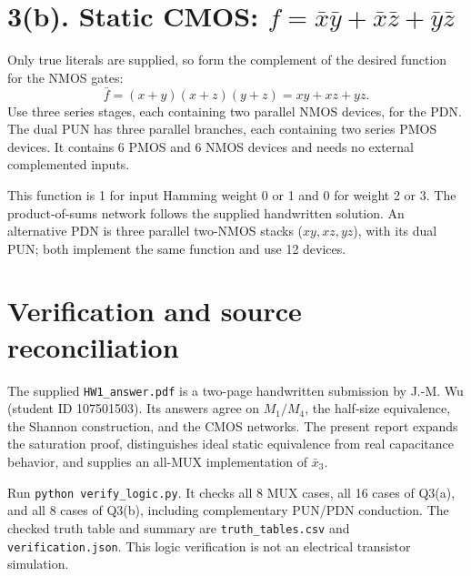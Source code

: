 \documentclass[11pt]{article}
\newcommand{\mos}[4]{\begin{scope}[shift={(#1,#2)}]
\draw (0,.24)--(0,-.24);
\draw (0,.20)--(.25,.20)--(.25,.5);
\draw (0,-.20)--(.25,-.20)--(.25,-.5);
\draw (-.16,.23)--(-.16,-.23);
\ifnum#4=1\draw (-.26,0) circle (.06);\draw (-.75,0)--(-.32,0);\else\draw (-.75,0)--(-.16,0);\fi
\node[anchor=east,font=\small] at (-.76,0) {$#3$};
\end{scope}}
\newcommand{\ground}[2]{\draw (#1,#2)--(#1,{#2-.12});\draw ({#1-.17},{#2-.12})--({#1+.17},{#2-.12});\draw ({#1-.11},{#2-.20})--({#1+.11},{#2-.20});}
\newcommand{\rail}[3]{\draw (#1,#2)--(#1,{#2+.15});\node[above,font=\small] at (#1,{#2+.15}) {$#3$};}
\newcommand{\outputnode}[3]{\fill (#1,#2) circle (.04);\draw (#1,#2)--({#1+.7},#2) node[right] {$#3$};}
\begin{document}
\newpage
\section*{3(b). Static CMOS: $f=\bar{x}\bar{y}+\bar{x}\bar{z}+\bar{y}\bar{z}$}
Only true literals are supplied, so form the complement of the desired function for the NMOS gates:
\[
 \bar f=(x+y)(x+z)(y+z)=xy+xz+yz.
\]
Use three series stages, each containing two parallel NMOS devices, for the PDN. The dual PUN has three parallel branches, each containing two series PMOS devices. It contains 6 PMOS and 6 NMOS devices and needs no external complemented inputs.
\begin{center}\end{center}
This function is 1 for input Hamming weight 0 or 1 and 0 for weight 2 or 3. The product-of-sums network follows the supplied handwritten solution. An alternative PDN is three parallel two-NMOS stacks ($xy,xz,yz$), with its dual PUN; both implement the same function and use 12 devices.

\section*{Verification and source reconciliation}
The supplied \texttt{HW1\_answer.pdf} is a two-page handwritten submission by J.-M. Wu (student ID 107501503). Its answers agree on $M_1/M_4$, the half-size equivalence, the Shannon construction, and the CMOS networks. The present report expands the saturation proof, distinguishes ideal static equivalence from real capacitance behavior, and supplies an all-MUX implementation of $\bar{x}_3$.

Run \texttt{python verify\_logic.py}. It checks all 8 MUX cases, all 16 cases of Q3(a), and all 8 cases of Q3(b), including complementary PUN/PDN conduction. The checked truth table and summary are \texttt{truth\_tables.csv} and \texttt{verification.json}. This logic verification is not an electrical transistor simulation.
\end{document}
